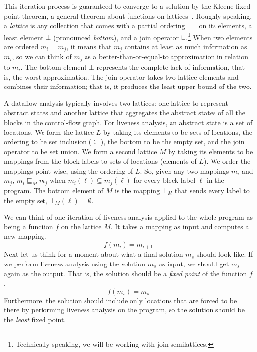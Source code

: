 \documentclass[7x10]{TimesAPriori_MIT}%
\numberwithin{theorem}{chapter}
\numberwithin{definition}{chapter}
\numberwithin{equation}{chapter}
\begin{document}
This iteration process is guaranteed to converge to a solution by the
Kleene fixed-point theorem, a general theorem about functions on
lattices~\citep{Kleene:1952aa}. Roughly speaking, a \emph{lattice} is
any collection that comes with a partial ordering $\sqsubseteq$ on its
elements, a least element $\bot$ (pronounced \emph{bottom}), and a
join operator
$\sqcup$.\footnote{Technically speaking, we
  will be working with join semilattices.} When two elements are
ordered $m_i \sqsubseteq m_j$, it means that $m_j$ contains at least
as much information as $m_i$, so we can think of $m_j$ as a
better-than-or-equal-to approximation in relation to $m_i$.  The
bottom element $\bot$ represents the complete lack of information,
that is, the worst approximation.  The join operator takes two lattice
elements and combines their information; that is, it produces the
least upper bound of the two.

A dataflow analysis typically involves two lattices: one lattice to
represent abstract states and another lattice that aggregates the
abstract states of all the blocks in the control-flow graph.  For
liveness analysis, an abstract state is a set of locations.  We form
the lattice $L$ by taking its elements to be sets of locations, the
ordering to be set inclusion ($\subseteq$), the bottom to be the empty
set, and the join operator to be set union.
%
We form a second lattice $M$ by taking its elements to be mappings
from the block labels to sets of locations (elements of $L$).  We
order the mappings point-wise, using the ordering of $L$. So, given any
two mappings $m_i$ and $m_j$, $m_i \sqsubseteq_M m_j$ when $m_i(\ell)
\subseteq m_j(\ell)$ for every block label $\ell$ in the program.  The
bottom element of $M$ is the mapping $\bot_M$ that sends every label
to the empty set, $\bot_M(\ell) = \emptyset$.

We can think of one iteration of liveness analysis applied to the
whole program as being a function $f$ on the lattice $M$. It takes a
mapping as input and computes a new mapping.
\[
   f(m_i) = m_{i+1}
\]
Next let us think for a moment about what a final solution $m_s$
should look like. If we perform liveness analysis using the solution
$m_s$ as input, we should get $m_s$ again as the output. That is, the
solution should be a \emph{fixed point} of the function $f$.
\[
   f(m_s) = m_s
\]
Furthermore, the solution should include only locations that are
forced to be there by performing liveness analysis on the program, so
the solution should be the \emph{least} fixed point.
\end{document}
